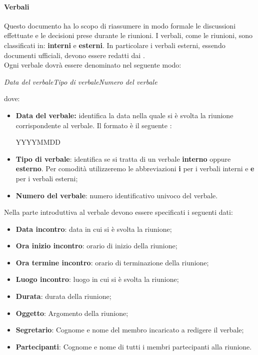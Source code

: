 \paragraph{Verbali}
Questo documento ha lo scopo di riassumere in modo formale le discussioni effettuate e le decisioni 
prese durante le riunioni. I verbali, come le riunioni, sono classificati in: 
\textbf{interni} e \textbf{esterni}. In particolare i verbali esterni, essendo 
documenti ufficiali, devono essere redatti dai \textit{\RdP}. \\
Ogni verbale dovrà essere denominato nel seguente modo:
\begin{center}
  \textit{{Data del verbale}{Tipo di verbale}{Numero del verbale}}
\end{center}
dove:
\begin{itemize}
  \item \textbf{Data del verbale:} identifica la data nella quale si è svolta la 
  riunione corrispondente al verbale. Il formato è il seguente : 
  \begin{center}
  YYYYMMDD
  \end{center}
  \item \textbf{Tipo di verbale}: identifica se si tratta di un verbale \textbf{interno} oppure \textbf{esterno}.
  Per comodità utilizzeremo le abbreviazioni \textbf{i} per i verbali interni e \textbf{e} per i verbali 
  esterni;
  \item \textbf{Numero del verbale}: numero identificativo univoco del verbale.  
\end{itemize}
Nella parte introduttiva al verbale devono essere specificati i seguenti dati:
\begin{itemize}
  \item \textbf{Data incontro}: data in cui si è svolta la riunione;
  \item \textbf{Ora inizio incontro}: orario di inizio della riunione;
  \item \textbf{Ora termine incontro}: orario di terminazione della riunione;
  \item \textbf{Luogo incontro}: luogo in cui si è svolta la riunione;
  \item \textbf{Durata}: durata della riunione;
  \item \textbf{Oggetto}: Argomento della riunione;
  \item \textbf{Segretario}: Cognome e nome del membro incaricato a redigere il 
  verbale;
  \item \textbf{Partecipanti}: Cognome e nome di tutti i membri partecipanti 
  alla riunione.
\end{itemize}

